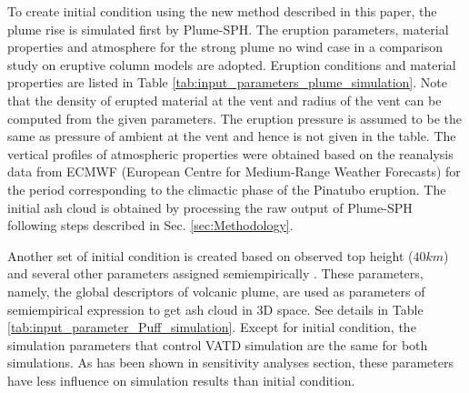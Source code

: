 \documentclass[draft,linenumbers]{agujournal2019}
\begin{document}
To create initial condition using the new method described in this paper, the plume rise  is simulated first by Plume-SPH. The eruption parameters, material properties and atmosphere for the strong plume no wind case in a comparison study on eruptive column models \citep {costa2016results} are adopted. Eruption conditions and material properties are listed in Table \ref{tab:input_parameters_plume_simulation}. Note that the density of erupted material at the vent and radius of the vent can be computed from the given parameters. The eruption pressure is assumed to be the same as pressure of ambient at the vent and hence is not given in the table. The vertical profiles of atmospheric properties were obtained based on the reanalysis data from ECMWF (European Centre for Medium-Range Weather Forecasts) for the period corresponding to the climactic phase of the Pinatubo eruption. The initial ash cloud is obtained by processing the raw output of Plume-SPH following steps described in Sec. \ref{sec:Methodology}.

Another set of initial condition is created based on observed top height ($40 km$) and several other parameters assigned semiempirically \citep{bursik2012estimation}. These parameters, namely, the global descriptors of volcanic plume, are used as parameters of semiempirical expression to get ash cloud in 3D space. See details in Table \ref{tab:input_parameter_Puff_simulation}. Except for initial condition, the simulation parameters that control VATD simulation are the same for both simulations. As has been shown in sensitivity analyses section, these parameters have less influence on simulation results than initial condition.
 
\end{document}
